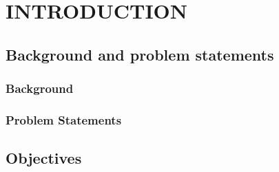 \documentclass[main]{subfiles}
\begin{document}
\chapter{INTRODUCTION}



\section{Background and problem statements}
    \subsection{Background}

    \subsection{Problem Statements}

\section{Objectives}
\end{document}
